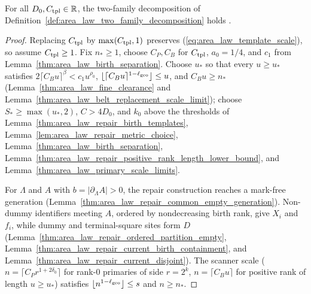 \begin{theorem}
    \label{thm:area_law_two_family_decomposition}
    \leanok
    For all $D_0,C_{\rm tpl}\in\mathbb R$, the two-family decomposition of
    Definition~\ref{def:area_law_two_family_decomposition} holds
    \cite[Proposition~11.2]{OpenAI2026AreaLaw}.
\end{theorem}
\begin{proof}
    \leanok
    Replacing $C_{\rm tpl}$ by $\max(C_{\rm tpl},1)$ preserves
    (\ref{eq:area_law_template_scale}), so assume $C_{\rm tpl}\ge1$. Fix
    $n_*\ge1$, choose $C_P,C_B$ for $C_{\rm tpl}$, $a_0=1/4$, and $c_1$ from
    Lemma~\ref{thm:area_law_birth_separation}. Choose $u_*$ so that every
    $u\ge u_*$ satisfies $2\lceil C_Bu\rceil^\beta<c_1u^{\rho_0}$,
    $\lfloor\lceil C_Bu\rceil^{1-\ell_{\rm geo}}\rfloor\le u$, and
    $C_Bu\ge n_*$ (Lemma~\ref{thm:area_law_fine_clearance} and
    Lemma~\ref{thm:area_law_belt_replacement_scale_limit}); choose
    $S_*\ge\max(u_*,2)$, $C>4D_0$, and $k_0$ above the thresholds of
    Lemma~\ref{thm:area_law_repair_birth_templates},
    Lemma~\ref{lem:area_law_repair_metric_choice},
    Lemma~\ref{thm:area_law_birth_separation},
    Lemma~\ref{thm:area_law_repair_positive_rank_length_lower_bound}, and
    Lemma~\ref{thm:area_law_primary_scale_limits}.

    For $\Lambda$ and $A$ with $b=|\partial_\Lambda A|>0$, the repair
    construction reaches a mark-free generation
    (Lemma~\ref{thm:area_law_repair_common_empty_generation}). Non-dummy
    identifiers meeting $A$, ordered by nondecreasing birth rank, give $X_i$ and
    $f_i$, while dummy and terminal-square sites form $D$
    (Lemma~\ref{thm:area_law_repair_ordered_partition_empty},
    Lemma~\ref{thm:area_law_repair_current_birth_containment}, and
    Lemma~\ref{thm:area_law_repair_current_disjoint}). The scanner scale
    ($n=\lceil C_P r^{1+2\delta_0}\rceil$ for rank-$0$ primaries of side $r=2^k$,
    $n=\lceil C_B u\rceil$ for positive rank of length $u\ge u_*$) satisfies
    $\lfloor n^{1-\ell_{\rm geo}}\rfloor\le s$ and $n\ge n_*$.


\end{proof}
